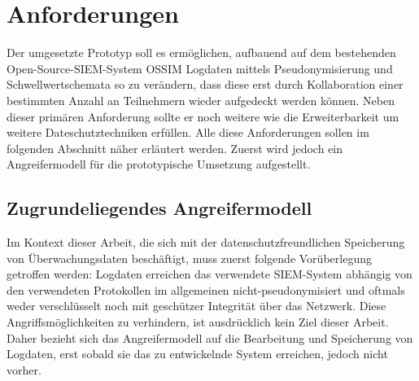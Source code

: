 \section{Anforderungen}

\label{sec_impl_requirements}

Der umgesetzte Prototyp soll es ermöglichen, aufbauend auf dem bestehenden Open-Source-SIEM-System OSSIM Logdaten mittels Pseudonymisierung und Schwellwertschemata so zu verändern, dass diese erst durch Kollaboration einer bestimmten Anzahl an Teilnehmern wieder aufgedeckt werden können. Neben dieser primären Anforderung sollte er noch weitere wie die Erweiterbarkeit um weitere Dateschutztechniken erfüllen. Alle diese Anforderungen sollen im folgenden Abschnitt näher erläutert werden. Zuerst wird jedoch ein Angreifermodell für die prototypische Umsetzung aufgestellt.

\subsection{Zugrundeliegendes Angreifermodell}

\label{subsec_impl_requirements_attackermodel}


Im Kontext dieser Arbeit, die sich mit der datenschutzfreundlichen Speicherung von Überwachungsdaten beschäftigt, muss zuerst folgende Vorüberlegung getroffen werden: Logdaten erreichen das verwendete SIEM-System abhängig von den verwendeten Protokollen im allgemeinen nicht-pseudonymisiert und oftmals weder verschlüsselt noch mit geschützer Integrität über das Netzwerk. 
Diese Angriffsmöglichkeiten zu verhindern, ist ausdrücklich kein Ziel dieser Arbeit. Daher bezieht sich das Angreifermodell auf die Bearbeitung und Speicherung von Logdaten, erst sobald sie das zu entwickelnde System erreichen, jedoch nicht vorher.

